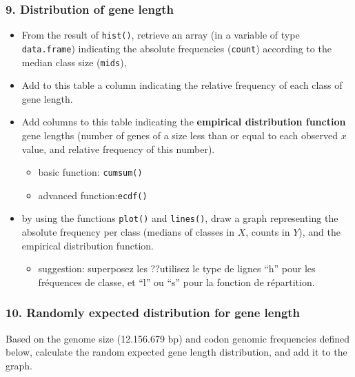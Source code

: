 \documentclass[]{article}
\providecommand{\tightlist}{%
  \setlength{\itemsep}{0pt}\setlength{\parskip}{0pt}}
\begin{document}
\subsubsection{9. Distribution of gene
length}\label{distribution-of-gene-length}

\begin{itemize}
\item
  From the result of \texttt{hist()}, retrieve an array (in a variable
  of type \texttt{data.frame}) indicating the absolute frequencies
  (\texttt{count}) according to the median class size (\texttt{mids}),
\item
  Add to this table a column indicating the relative frequency of each
  class of gene length.
\item
  Add columns to this table indicating the \textbf{empirical
  distribution function} gene lengths (number of genes of a size less
  than or equal to each observed \(x\) value, and relative frequency of
  this number).

  \begin{itemize}
  \tightlist
  \item
    basic function: \texttt{cumsum()}
  \item
    advanced function:\texttt{ecdf()}
  \end{itemize}
\item
  by using the functions \texttt{plot()} and \texttt{lines()}, draw a
  graph representing the absolute frequency per class (medians of
  classes in \(X\), counts in \(Y\)), and the empirical distribution
  function.

  \begin{itemize}
  \tightlist
  \item
    suggestion: superposez les ??utilisez le type de lignes ``h'' pour
    les fréquences de classe, et ``l'' ou ``s'' pour la fonction de
    répartition.
  \end{itemize}
\end{itemize}

\subsubsection{10. Randomly expected distribution for gene
length}\label{randomly-expected-distribution-for-gene-length}

Based on the genome size (12.156.679 bp) and codon genomic frequencies
defined below, calculate the random expected gene length distribution,
and add it to the graph.
\end{document}
